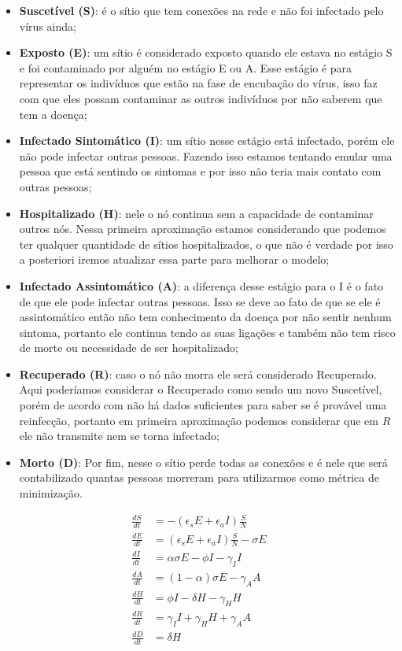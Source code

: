 \begin{itemize}
  \item \textbf{Suscetível (S)}: é o sítio que tem conexões na rede e não foi infectado pelo vírus ainda;
  \item \textbf{Exposto (E)}: um sítio é considerado exposto quando ele estava no estágio S e foi contaminado por alguém no estágio E ou A. Esse estágio é para representar os indivíduos que estão na fase de encubação do vírus, isso faz com que eles possam contaminar as outros indivíduos por não saberem que tem a doença;
  \item \textbf{Infectado Sintomático (I)}: um sítio nesse estágio está infectado, porém ele não pode infectar outras pessoas. Fazendo isso estamos tentando emular uma pessoa que está sentindo os sintomas e por isso não teria mais contato com outras pessoas;
  \item \textbf{Hospitalizado (H)}: nele o nó continua sem a capacidade de contaminar outros nós. Nessa primeira aproximação estamos considerando que podemos ter qualquer quantidade de sítios hospitalizados, o que não é verdade por isso a posteriori iremos atualizar essa parte para melhorar o modelo;
  \item \textbf{Infectado Assintomático (A)}: a diferença desse estágio para o I é o fato de que ele pode infectar outras pessoas. Isso se deve ao fato de que se ele é assintomático então não tem conhecimento da doença por não sentir nenhum sintoma, portanto ele continua tendo as suas ligações e também não tem risco de morte ou necessidade de ser hospitalizado;
  \item \textbf{Recuperado (R)}: caso o nó não morra ele será considerado Recuperado. Aqui poderíamos considerar o Recuperado como sendo um novo Suscetível, porém de acordo com \cite{reinfect} não há dados suficientes para saber se é provável uma reinfecção, portanto em primeira aproximação podemos considerar que em $R$ ele não transmite nem se torna infectado;
  \item \textbf{Morto (D)}: Por fim, nesse o sítio perde todas as conexões e é nele que será contabilizado quantas pessoas morreram para utilizarmos como métrica de minimização.
\end{itemize}

\begin{align}
  \frac{dS}{dt} &= -(\epsilon_s E + \epsilon_aI)\frac{S}{N}\\
  \frac{dE}{dt} &= (\epsilon_s E + \epsilon_aI)\frac{S}{N} - \sigma E\\
  \frac{dI}{dt} &= \alpha\sigma E - \phi I -\gamma_I I \\
  \frac{dA}{dt} &= (1 - \alpha)\sigma E -\gamma_A A\\
  \frac{dH}{dt} &= \phi I - \delta H -\gamma_H H \\
  \frac{dR}{dt} &= \gamma_I I +\gamma_H H +\gamma_A A \\
  \frac{dD}{dt} &= \delta H 
\end{align}

